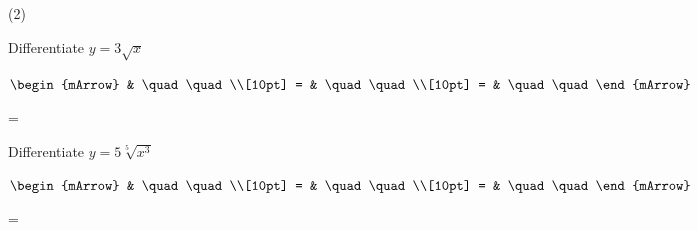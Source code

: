 \clearpage
\begin{mtask}(2)
	\task \begin{exercise} Differentiate $y=3\sqrt{x} $
           \begin{envSolution}
             $\begin{mArrow}
                   & \quad \quad              \\[10pt]
		   		 = & \quad \quad              \\[10pt]
				 = & \quad \quad 
              \end{mArrow}$
            \begin{shortsolution}  
			     =$ \quad \quad \quad \quad$
			\end{shortsolution}				 
           \end{envSolution}
         \end{exercise}
	\task \begin{exercise} Differentiate $y=5\sqrt[5]{x^3} $
           \begin{envSolution}
             $\begin{mArrow}
                   & \quad \quad              \\[10pt]
		   		 = & \quad \quad              \\[10pt]
				 = & \quad \quad 
              \end{mArrow}$
            \begin{shortsolution}  
			     =$ \quad \quad \quad \quad$
			\end{shortsolution}				 
           \end{envSolution}
         \end{exercise}
\end{mtask}


